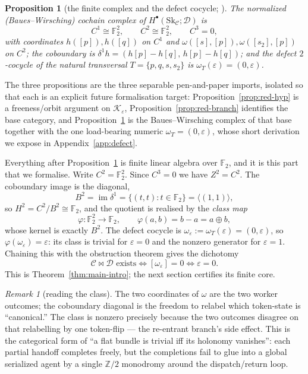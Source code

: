\documentclass[11pt]{amsart}
\newtheorem{proposition}[theorem]{Proposition}
\theoremstyle{definition}
\theoremstyle{remark}
\newtheorem{remark}[theorem]{Remark}
\newcommand{\C}{\mathcal{C}}
\newcommand{\D}{\mathcal{D}}
\newcommand{\K}{\mathcal{K}}
\newcommand{\Sk}{\mathrm{Sk}}
\newcommand{\dir}{\mathcal{D}}
\newcommand{\FF}{\mathbb{F}_2}
\begin{document}
\begin{proposition}[the finite complex and the defect cocycle; {\cite{analytic}}]\label{prop:red-complex}
The normalized \textup{(}Baues--Wirsching\textup{)} cochain complex of $H^\bullet(\Sk_\C;\dir)$ is
\[
  C^1\cong\FF^2,\qquad C^2\cong\FF^2,\qquad C^3=0,
\]
with coordinates $h([p]),h([q])$ on $C^1$ and $\omega([s],[p]),\omega([s_2],[p])$ on $C^2$; the
coboundary is $\delta^1 h=(h[p]-h[q],\,h[p]-h[q])$; and the defect $2$-cocycle of the natural
transversal $T=\{p,q,s,s_2\}$ is $\omega_T(\varepsilon)=(0,\varepsilon)$.
\end{proposition}

The three propositions are the three separable pen-and-paper imports, isolated so that each is an
explicit future formalisation target: Proposition~\ref{prop:red-hyp} is a freeness/orbit argument on
$\K_\varepsilon$, Proposition~\ref{prop:red-branch} identifies the base category, and
Proposition~\ref{prop:red-complex} is the Baues--Wirsching complex of that base together with the one
load-bearing numeric $\omega_T=(0,\varepsilon)$, whose short derivation we expose in
Appendix~\ref{app:defect}.

Everything after Proposition~\ref{prop:red-complex} is finite linear algebra over $\FF$, and it is this
part that we formalise. Write $C^2=\FF^2$. Since $C^3=0$ we have $Z^2=C^2$. The coboundary image is
the diagonal,
\[
  B^2=\operatorname{im}\delta^1=\{(t,t):t\in\FF\}=\langle(1,1)\rangle,
\]
so $H^2=C^2/B^2\cong\FF$, and the quotient is realised by the \emph{class map}
\[
  \varphi:\FF^2\to\FF,\qquad \varphi(a,b)=b-a=a\oplus b,
\]
whose kernel is exactly $B^2$. The defect cocycle is $\omega_\varepsilon:=\omega_T(\varepsilon)=
(0,\varepsilon)$, so $\varphi(\omega_\varepsilon)=\varepsilon$: its class is trivial for
$\varepsilon=0$ and the nonzero generator for $\varepsilon=1$. Chaining this with the obstruction
theorem gives the dichotomy
\[
  \C\bowtie\D\text{ exists}\iff [\omega_\varepsilon]=0\iff \varepsilon=0 .
\]
This is Theorem~\ref{thm:main-intro}; the next section certifies its finite core.

\begin{remark}[reading the class]
The two coordinates of $\omega$ are the two worker outcomes; the coboundary diagonal is the freedom to
relabel which token-state is ``canonical.'' The class is nonzero precisely because the two outcomes
disagree on that relabelling by one token-flip --- the re-entrant branch's side effect. This is the
categorical form of ``a flat bundle is trivial iff its holonomy vanishes'': each partial handoff
completes freely, but the completions fail to glue into a global serialized agent by a single
$\mathbb Z/2$ monodromy around the dispatch/return loop.
\end{remark}
\end{document}
